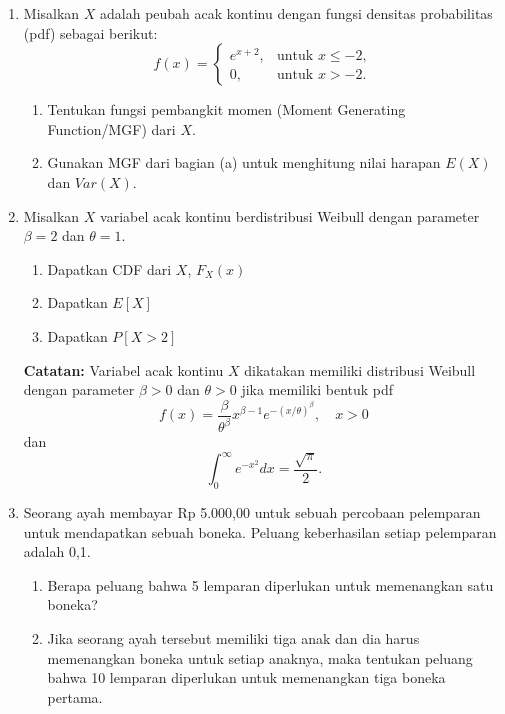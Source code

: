 \documentclass[11pt,letterpaper]{article}
\begin{document}
\begin{enumerate}
  \item Misalkan $X$ adalah peubah acak kontinu dengan fungsi densitas probabilitas (pdf) sebagai berikut:
        \[ f(x) = \begin{cases} e^{x+2}, & \text{untuk } x \le -2, \\ 0, & \text{untuk } x > -2. \end{cases} \]
        \begin{enumerate}[label=\alph*.]
          \item Tentukan fungsi pembangkit momen (Moment Generating Function/MGF) dari $X$.
          \item Gunakan MGF dari bagian (a) untuk menghitung nilai harapan $E(X)$ dan $Var(X)$.
        \end{enumerate}
        \vspace{0.3cm}

  \item Misalkan $X$ variabel acak kontinu berdistribusi Weibull dengan parameter $\beta = 2$ dan $\theta = 1$.
        \begin{enumerate}[label=\alph*.]
          \item Dapatkan CDF dari $X$, $F_X(x)$
          \item Dapatkan $E[X]$
          \item Dapatkan $P[X > 2]$
        \end{enumerate}
        \textbf{Catatan:} Variabel acak kontinu $X$ dikatakan memiliki distribusi Weibull dengan parameter $\beta > 0$ dan $\theta > 0$ jika memiliki bentuk pdf
        \[ f(x) = \frac{\beta}{\theta^\beta} x^{\beta-1} e^{-(x/\theta)^\beta}, \quad x > 0 \]
        dan
        \[ \int_{0}^{\infty} e^{-x^2} dx = \frac{\sqrt{\pi}}{2} . \]
        \vspace{0.3cm}

  \item Seorang ayah membayar Rp 5.000,00 untuk sebuah percobaan pelemparan untuk mendapatkan sebuah boneka. Peluang keberhasilan setiap pelemparan adalah 0,1.
        \begin{enumerate}[label=\alph*.]
          \item Berapa peluang bahwa 5 lemparan diperlukan untuk memenangkan satu boneka?
          \item Jika seorang ayah tersebut memiliki tiga anak dan dia harus memenangkan boneka untuk setiap anaknya, maka tentukan peluang bahwa 10 lemparan diperlukan untuk memenangkan tiga boneka pertama.
        \end{enumerate}
\end{enumerate}
\end{document}
